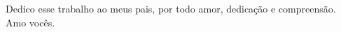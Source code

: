 \thispagestyle{empty}
\begin{spacing}{1}
\vspace*{\fill}
\begin{quoting}[leftmargin=6.5cm, rightmargin=1cm]
Dedico esse trabalho ao meus pais, por todo amor, dedicação e compreensão. Amo vocês.  
\end{quoting}
\end{spacing}
\newpage
